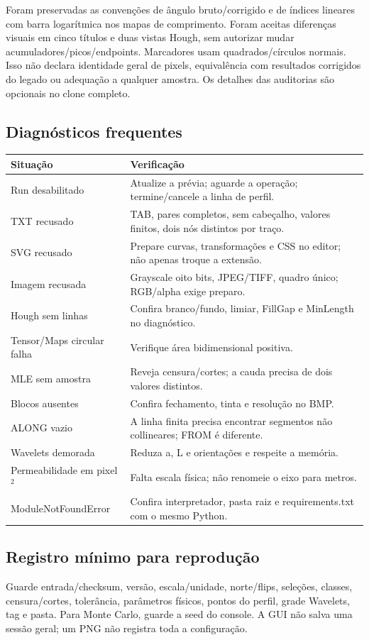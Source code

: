 Foram preservadas as convenções de ângulo bruto/corrigido e de índices lineares com barra logarítmica nos mapas de comprimento. Foram aceitas diferenças visuais em cinco títulos e duas vistas Hough, sem autorizar mudar acumuladores/picos/endpoints. Marcadores usam quadrados/círculos normais. Isso não declara identidade geral de pixels, equivalência com resultados corrigidos do legado ou adequação a qualquer amostra. Os detalhes das auditorias são opcionais no clone completo.

\subsection{Diagnósticos frequentes}
\begin{longtable}{@{}p{.34\linewidth}p{.58\linewidth}@{}}
\toprule Situação & Verificação\\\midrule\endhead
Run desabilitado & Atualize a prévia; aguarde a operação; termine/cancele a linha de perfil.\\
TXT recusado & TAB, pares completos, sem cabeçalho, valores finitos, dois nós distintos por traço.\\
SVG recusado & Prepare curvas, transformações e CSS no editor; não apenas troque a extensão.\\
Imagem recusada & Grayscale oito bits, JPEG/TIFF, quadro único; RGB/alpha exige preparo.\\
Hough sem linhas & Confira branco/fundo, limiar, FillGap e MinLength no diagnóstico.\\
Tensor/Maps circular falha & Verifique área bidimensional positiva.\\
MLE sem amostra & Reveja censura/cortes; a cauda precisa de dois valores distintos.\\
Blocos ausentes & Confira fechamento, tinta e resolução no BMP.\\
ALONG vazio & A linha finita precisa encontrar segmentos não collineares; FROM é diferente.\\
Wavelets demorada & Reduza a, L e orientações e respeite a memória.\\
Permeabilidade em pixel\(^{2}\) & Falta escala física; não renomeie o eixo para metros.\\
ModuleNotFoundError & Confira interpretador, pasta raiz e requirements.txt com o mesmo Python.\\\bottomrule
\end{longtable}

\subsection{Registro mínimo para reprodução}
Guarde entrada/checksum, versão, escala/unidade, norte/flips, seleções, classes, censura/cortes, tolerância, parâmetros físicos, pontos do perfil, grade Wavelets, tag e pasta. Para Monte Carlo, guarde a seed do console. A GUI não salva uma sessão geral; um PNG não registra toda a configuração.


